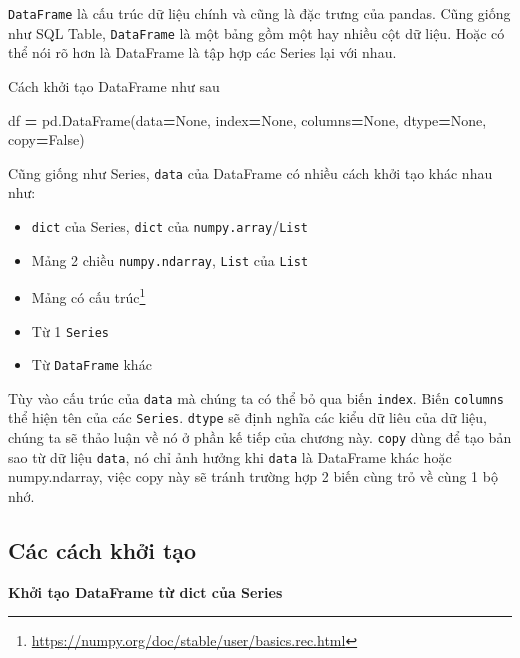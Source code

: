 \documentclass[
]{book}
\newenvironment{Shaded}{\begin{snugshade}}{\end{snugshade}}
\newcommand{\NormalTok}[1]{#1}
\newcommand{\OperatorTok}[1]{\textcolor[rgb]{0.81,0.36,0.00}{\textbf{#1}}}
\newcommand{\VariableTok}[1]{\textcolor[rgb]{0.00,0.00,0.00}{#1}}
\providecommand{\tightlist}{%
  \setlength{\itemsep}{0pt}\setlength{\parskip}{0pt}}
\renewcommand{\href}[2]{#2\footnote{\url{#1}}}
\begin{document}
\texttt{DataFrame} là cấu trúc dữ liệu chính và cũng là đặc trưng của pandas. Cũng giống như SQL Table,
\texttt{DataFrame} là một bảng gồm một hay nhiều cột dữ liệu. Hoặc có thể nói rõ hơn là DataFrame là tập
hợp các Series lại với nhau.

Cách khởi tạo DataFrame như sau

\begin{Shaded}
\begin{Highlighting}[]
\NormalTok{df }\OperatorTok{=}\NormalTok{ pd.DataFrame(data}\OperatorTok{=}\VariableTok{None}\NormalTok{, index}\OperatorTok{=}\VariableTok{None}\NormalTok{, columns}\OperatorTok{=}\VariableTok{None}\NormalTok{, dtype}\OperatorTok{=}\VariableTok{None}\NormalTok{, copy}\OperatorTok{=}\VariableTok{False}\NormalTok{)}
\end{Highlighting}
\end{Shaded}

Cũng giống như Series, \texttt{data} của DataFrame có nhiều cách khởi tạo khác nhau như:

\begin{itemize}
\tightlist
\item
  \texttt{dict} của Series, \texttt{dict} của \texttt{numpy.array}/\texttt{List}
\item
  Mảng 2 chiều \texttt{numpy.ndarray}, \texttt{List} của \texttt{List}
\item
  \href{https://numpy.org/doc/stable/user/basics.rec.html}{Mảng có cấu trúc}
\item
  Từ 1 \texttt{Series}
\item
  Từ \texttt{DataFrame} khác
\end{itemize}

Tùy vào cấu trúc của \texttt{data} mà chúng ta có thể bỏ qua biến \texttt{index}. Biến \texttt{columns} thể hiện tên
của các \texttt{Series}. \texttt{dtype} sẽ định nghĩa các kiểu dữ liêu của dữ liệu, chúng ta sẽ thảo luận về nó
ở phần kế tiếp của chương này. \texttt{copy} dùng để tạo bản sao từ dữ liệu \texttt{data}, nó chỉ ảnh hưởng khi
\texttt{data} là DataFrame khác hoặc numpy.ndarray, việc copy này sẽ tránh trường hợp 2 biến cùng trỏ về
cùng 1 bộ nhớ.

\hypertarget{cuxe1c-cuxe1ch-khux1edfi-tux1ea1o-1}{%
\subsection{Các cách khởi tạo}\label{cuxe1c-cuxe1ch-khux1edfi-tux1ea1o-1}}

\textbf{Khởi tạo DataFrame từ dict của Series}
\end{document}
